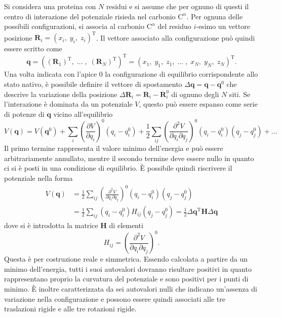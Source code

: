 Si considera una proteina con $ N $ residui e si assume che per ognuno di questi il centro di interazione del potenziale risieda nel carbonio $ \mathrm{C}^{\alpha} $. Per ognuna delle possibili configurazioni, si associa al carbonio $ \mathrm{C}^{\alpha} $ del residuo $ i $-esimo un vettore posizione $ \mathbf{R}_{i} = (x_{i}, \; y_{i}, \; z_{i})^{\mathrm{T}} $. 
Il vettore associato alla configurazione può quindi essere scritto come
\begin{equation}
	\mathbf{q} = ((\mathbf{R}_{1})^{\mathrm{T}}, \; ... \; , \; (\mathbf{R}_{N})^{\mathrm{T}})^{\mathrm{T}} =
	(x_{1}, \; y_{1}, \; z_{1}, \; ... \; , \; x_{N}, \; y_{N}, \; z_{N})^{\mathrm{T}}.
\end{equation}
Una volta indicata con l'apice $ 0 $ la configurazione di equilibrio corrispondente allo stato nativo, è possibile definire il vettore di spostamento $ \Delta \mathbf{q} = \mathbf{q} -  \mathbf{q}^0$ che descrive la variazione della posizione $ \Delta \mathbf{R}_{i} = \mathbf{R}_{i} -  \mathbf{R}^{0}_{i}$ di ognuno degli $ N $ siti.
Se l'interazione è dominata da un potenziale $ V $, questo può essere espanso come serie di potenze di $ \mathbf{q}  $ vicino all'equilibrio
\begin{equation}
	V(\mathbf{q}) =  V(\mathbf{q}^0) + \sum_i \left( \frac{\partial V}{\partial q_i} \right)^0 (q_i - q^{0}_{i}) + \frac{1}{2} \sum_{ij} \left( \frac{\partial^2 V}{\partial q_i \partial q_j} \right)^0 (q_i - q^{0}_{i})(q_j - q^{0}_{j}) + ...
\end{equation}
Il primo termine rappresenta il valore minimo dell'energia e può essere arbitrariamente annullato, mentre il secondo termine deve essere nullo in quanto ci si è posti in una condizione di equilibrio. È possibile quindi riscrivere il potenziale nella forma
\begin{equation}\label{eq:potential}
\begin{split}
	 V(\mathbf{q}) & = \frac{1}{2} \sum_{ij} \left( \frac{\partial^2 V}{\partial q_i \partial q_j} \right)^0 (q_i - q^{0}_{i})(q_j - q^{0}_{j}) \\
 	& =\frac{1}{2} \sum_{ij}  (q_i - q^{0}_{i}) H_{ij} (q_j - q^{0}_{j}) 
 	= \frac{1}{2} \Delta \mathbf{q}^{\mathrm{T}} \mathbf{H} \Delta \mathbf{q}
\end{split} 
\end{equation}
dove si è introdotta la matrice $ \mathbf{H} $ di elementi
\begin{equation} \label{def_mat}
	H_{ij} = \left( \frac{\partial^2 V}{\partial q_i \partial q_j} \right)^0.
\end{equation}
Questa è per costruzione reale e simmetrica. Essendo calcolata a partire da un minimo dell'energia, tutti i suoi autovalori dovranno risultare positivi in quanto rappresentano proprio la curvatura del potenziale e sono positivi per i punti di minimo. È inoltre caratterizzata da sei autovalori nulli che indicano un'assenza di variazione nella configurazione e possono essere quindi associati alle tre traslazioni rigide e alle tre rotazioni rigide.
 
